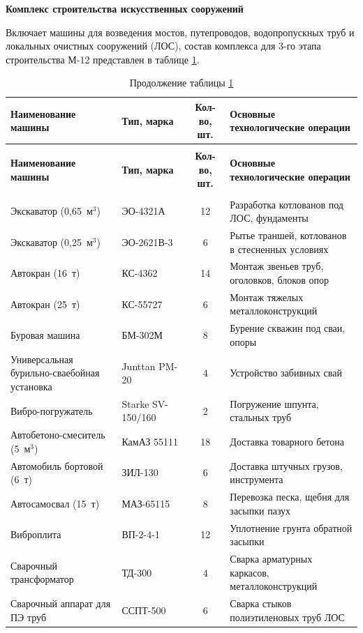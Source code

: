 \textbf{Комплекс строительства искусственных сооружений}

Включает машины для возведения мостов, путепроводов, водопропускных труб и локальных очистных сооружений (ЛОС), состав комплекса для 3-го этапа строительства М-12 представлен в таблице \ref{tab:structures_complex_qty}.

\begin{longtable}{|>{\raggedright\arraybackslash}p{3.8cm}|>{\raggedright\arraybackslash}p{3.2cm}|c|>{\raggedright\arraybackslash}p{5.0cm}|}
	\caption{Состав комплекса машин для искусственных сооружений} \label{tab:structures_complex_qty} \\
	\hline
	\textbf{Наименование машины} & \textbf{Тип, марка} & \textbf{Кол-во, шт.} & \textbf{Основные технологические операции} \\
	\hline
	\endfirsthead
	\caption*{Продолжение таблицы \ref{tab:structures_complex_qty}} \\
	\hline
	\textbf{Наименование машины} & \textbf{Тип, марка} & \textbf{Кол-во, шт.} & \textbf{Основные технологические операции} \\
	\hline
	\endhead
	\hline
	\multicolumn{4}{r}{\small Продолжение на следующей странице} \\
	\endfoot
	\hline
	\endlastfoot
	Экскаватор (0,65~м\(^3\)) & ЭО-4321А & 12 & Разработка котлованов под ЛОС, фундаменты \\
	Экскаватор (0,25~м\(^3\)) & ЭО-2621В-3 & 6 & Рытье траншей, котлованов в стесненных условиях \\
	Автокран (16~т) & КС-4362 & 14 & Монтаж звеньев труб, оголовков, блоков опор \\
	Автокран (25~т) & КС-55727 & 6 & Монтаж тяжелых металлоконструкций \\
	Буровая машина & БМ-302М & 8 & Бурение скважин под сваи, опоры \\
	Универсальная бурильно-сваебойная установка & Junttan PM-20 & 4 & Устройство забивных свай \\
	Вибро-погружатель & Starke SV-150/160 & 2 & Погружение шпунта, стальных труб \\
	Автобетоно-смеситель (5~м\(^3\)) & КамАЗ 55111 & 18 & Доставка товарного бетона \\
	Автомобиль бортовой (6~т) & ЗИЛ-130 & 6 & Доставка штучных грузов, инструмента \\
	Автосамосвал (15~т) & МАЗ-65115 & 8 & Перевозка песка, щебня для засыпки пазух \\
	Виброплита & ВП-2-4-1 & 12 & Уплотнение грунта обратной засыпки \\
	Сварочный трансформатор & ТД-300 & 4 & Сварка арматурных каркасов, металлоконструкций \\
	Сварочный аппарат для ПЭ труб & ССПТ-500 & 6 & Сварка стыков полиэтиленовых труб ЛОС \\
\end{longtable}

